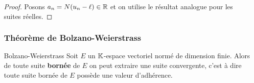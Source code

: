 \begin{proof}
    Posons $a_n = N(u_n - \ell) \in \mathbb{R}$ et on utilise le résultat analogue pour les suites réelles.
\end{proof}


\subsubsection{Théorème de Bolzano-Weierstrass}

\begin{theorement}{Bolzano-Weierstrass}{}
    Soit $E$ un $\mathbb{K}$-espace vectoriel normé de dimension finie. Alors de toute suite
    \textbf{bornée} de $E$ on peut extraire une suite convergente, c'est à dire toute 
    suite bornée de $E$ possède une valeur d'adhérence. 
    
\end{theorement}


